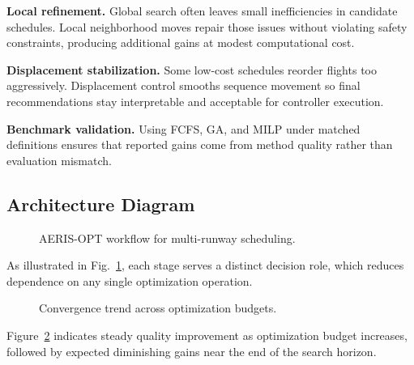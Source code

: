 \documentclass[conference]{IEEEtran}
\begin{document}
\textbf{Local refinement.} Global search often leaves small inefficiencies in candidate schedules. Local neighborhood moves repair those issues without violating safety constraints, producing additional gains at modest computational cost.

\textbf{Displacement stabilization.} Some low-cost schedules reorder flights too aggressively. Displacement control smooths sequence movement so final recommendations stay interpretable and acceptable for controller execution.

\textbf{Benchmark validation.} Using FCFS, GA, and MILP under matched definitions ensures that reported gains come from method quality rather than evaluation mismatch.

\subsection{Architecture Diagram}
\begin{figure}[htbp]
\centering
{}
\caption{AERIS-OPT workflow for multi-runway scheduling.}
\label{fig:architecture}
\end{figure}

As illustrated in Fig.~\ref{fig:architecture}, each stage serves a distinct decision role, which reduces dependence on any single optimization operation.

\begin{figure}[htbp]
\centering
{}
\caption{Convergence trend across optimization budgets.}
\label{fig:convergence}
\end{figure}

Figure~\ref{fig:convergence} indicates steady quality improvement as optimization budget increases, followed by expected diminishing gains near the end of the search horizon.
\end{document}
